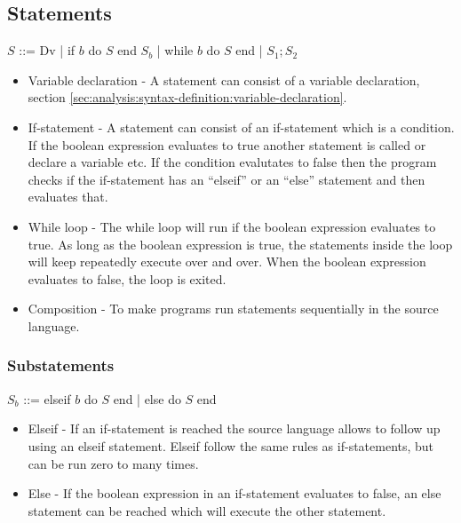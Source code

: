 \subsection{Statements}

$S$ ::= Dv | if $b$ do $S$ end $S_b$ | while $b$ do $S$ end | $S_1 ; S_2$

\begin{itemize}
	\item Variable declaration - A statement can consist of a variable declaration, section \ref{sec:analysis:syntax-definition:variable-declaration}.
	\item If-statement - A statement can consist of an if-statement which is a condition. If the boolean expression evaluates to true another statement is called or declare a variable etc. If the condition evalutates to false then the program checks if the if-statement has an ``elseif'' or an ``else'' statement and then evaluates that.
	\item While loop - The while loop will run if the boolean expression evaluates to true. As long as the boolean expression is true, the statements inside the loop will keep repeatedly execute over and over. When the boolean expression evaluates to false, the loop is exited.
	\item Composition - To make programs run statements sequentially in the source language.
\end{itemize}

\subsubsection{Substatements}

$S_b$ ::= {elseif $b$ do $S$ end} | else do $S$ end

\begin{itemize}
	\item Elseif - If an if-statement is reached the source language allows to follow up using an elseif statement. Elseif follow the same rules as if-statements, but can be run zero to many times.
	\item Else - If the boolean expression in an if-statement evaluates to false, an else statement can be reached which will execute the other statement.
\end{itemize}


